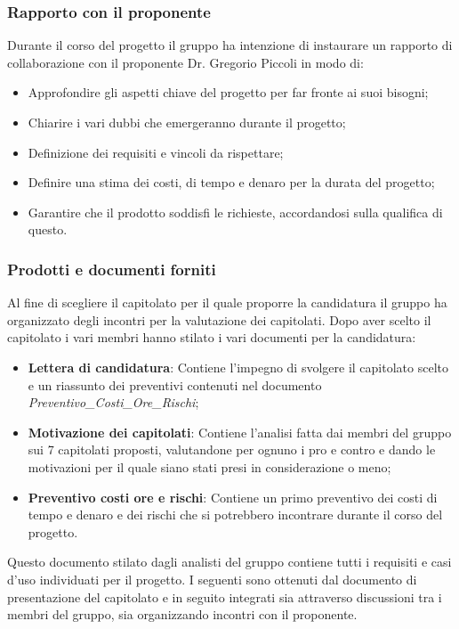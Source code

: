 \subsubsection{Rapporto con il proponente}
Durante il corso del progetto il gruppo ha intenzione di instaurare un rapporto di collaborazione con il proponente Dr. Gregorio Piccoli in modo di:
\begin{itemize}
	\item Approfondire gli aspetti chiave del progetto per far fronte ai suoi bisogni;
	\item Chiarire i vari dubbi che emergeranno durante il progetto;
	\item Definizione dei requisiti e vincoli da rispettare;
	\item Definire una stima dei costi, di tempo e denaro per la durata del progetto;
	\item Garantire che il prodotto soddisfi le richieste, accordandosi sulla qualifica di questo.
\end{itemize} 

\subsubsection{Prodotti e documenti forniti}
Al fine di scegliere il capitolato per il quale proporre la candidatura il gruppo ha organizzato degli incontri per la valutazione dei capitolati. Dopo aver scelto il capitolato i vari membri hanno stilato i vari documenti per la candidatura:
\begin{itemize}
	\item \textbf{Lettera di candidatura}: Contiene l'impegno di svolgere il capitolato scelto e un riassunto dei preventivi contenuti nel documento \textit{Preventivo\_Costi\_Ore\_Rischi};
	\item \textbf{Motivazione dei capitolati}: Contiene l'analisi fatta dai membri del gruppo sui 7 capitolati proposti, valutandone per ognuno i pro e contro e dando le motivazioni per il quale siano stati presi in considerazione o meno;
	\item \textbf{Preventivo costi ore e rischi}: Contiene un primo preventivo dei costi di tempo e denaro e dei rischi che si potrebbero incontrare durante il corso del progetto.
\end{itemize}
Questo documento stilato dagli analisti del gruppo contiene tutti i requisiti e casi d'uso individuati per il progetto. I seguenti sono ottenuti dal documento di presentazione del capitolato e in seguito integrati sia attraverso discussioni tra i membri del gruppo, sia organizzando incontri con il proponente. 
